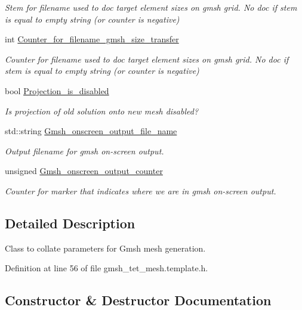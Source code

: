 \begin{DoxyCompactItemize}
\begin{DoxyCompactList}\small\item\em Stem for filename used to doc target element sizes on gmsh grid. No doc if stem is equal to empty string (or counter is negative) \end{DoxyCompactList}\item 
int \hyperlink{classoomph_1_1GmshParameters_af6ca2a71d6aae3f8c51e9b4ad53b787a}{Counter\+\_\+for\+\_\+filename\+\_\+gmsh\+\_\+size\+\_\+transfer}
\begin{DoxyCompactList}\small\item\em Counter for filename used to doc target element sizes on gmsh grid. No doc if stem is equal to empty string (or counter is negative) \end{DoxyCompactList}\item 
bool \hyperlink{classoomph_1_1GmshParameters_aebabc7ca82ac23e87e164655b6dc9bb4}{Projection\+\_\+is\+\_\+disabled}
\begin{DoxyCompactList}\small\item\em Is projection of old solution onto new mesh disabled? \end{DoxyCompactList}\item 
std\+::string \hyperlink{classoomph_1_1GmshParameters_af2da0d4c57e32c06c70a6aa25d1461ac}{Gmsh\+\_\+onscreen\+\_\+output\+\_\+file\+\_\+name}
\begin{DoxyCompactList}\small\item\em Output filename for gmsh on-\/screen output. \end{DoxyCompactList}\item 
unsigned \hyperlink{classoomph_1_1GmshParameters_ab3648c8847da428cddca41e676042e33}{Gmsh\+\_\+onscreen\+\_\+output\+\_\+counter}
\begin{DoxyCompactList}\small\item\em Counter for marker that indicates where we are in gmsh on-\/screen output. \end{DoxyCompactList}\end{DoxyCompactItemize}


\subsection{Detailed Description}
Class to collate parameters for Gmsh mesh generation. 

Definition at line 56 of file gmsh\+\_\+tet\+\_\+mesh.\+template.\+h.



\subsection{Constructor \& Destructor Documentation}
\mbox{\label{classoomph_1_1GmshParameters_a6a4e43f09a5de3155dee5b3d5c1a206b}} 
